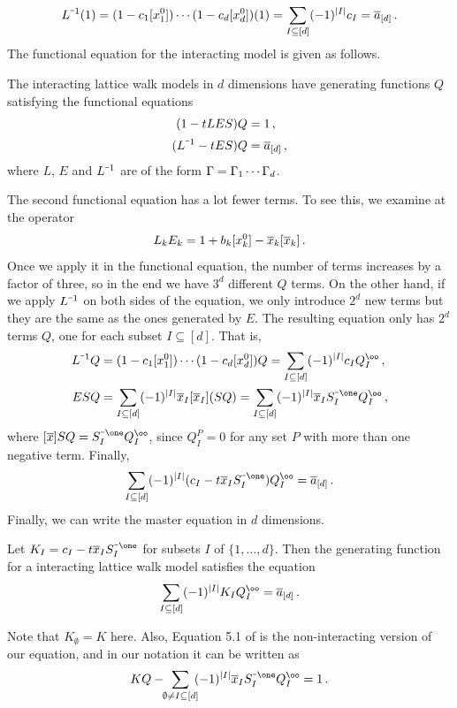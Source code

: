 \begin{align}
	L^{\um 1}(1) = (1-c_1[x_1^0])\cdots(1-c_d[x_d^0])(1) = \sum_{I\subseteq [d]}(-1)^{|I|}c_I = \ol a_{[d]}\,.
\end{align}
The \highD functional equation for the \classic interacting model is given as follows.
\begin{thm} The \classic interacting lattice walk models in $d$ dimensions have generating functions $Q$ satisfying the functional equations
\begin{align}
	(1-tLES)Q &= 1\,,\\
	(L^{\um 1}-t ES)Q &= \ol a_{[d]}\,,
\end{align}
where $L$, $E$ and $L^{\um 1}$ are of the form $\Gamma = \Gamma_1\cdots\Gamma_d$.
\end{thm}
The second functional equation has a lot fewer terms. To see this, we examine at the operator
\begin{align}
	L_kE_k = 1 + b_k[x_k^0]-\overline{x}_k[\overline{x}_k]\,.
\end{align}
Once we apply it in the functional equation, the number of terms increases by a factor of three, so in the end we have $3^d$ different $Q$ terms. On the other hand, if we apply $L^{\um 1}$ on both sides of the equation, we only introduce $2^d$ new terms but they are the same as the ones generated by $E$. The resulting equation only has $2^d$ terms $Q$, one for each subset $I \subseteq [d]$. That is,
\begin{subequations}
	\label{eq:ExpExt}
	\begin{align}
		L^{\um 1} Q &= (1-c_1[x_1^0])\cdots(1-c_d[x_d^0])Q = \sum_{I\subseteq [d]} (-1)^{|I|} c_I Q_I^\oo\,,\\
		 ESQ &= \sum_{I\subseteq [d]} (-1)^{|I|} \ol x_I [\ol x_I](SQ)= \sum_{I\subseteq [d]} (-1)^{|I|} \ol x_I S_I^{\um \one}Q_I^\oo\,,
	\end{align}
\end{subequations}
where $[\ol x]SQ = S_I^{\um \one} Q_I^\oo$, since $Q_I^P = 0$ for any set $P$ with more than one negative term. Finally,
\begin{align}
	\sum_{I \subseteq [d]}(-1)^{|I|}(c_I-t \ol x_IS_{I}^{\um \one})Q_I^\oo = \ol a_{[d]}\,.
\end{align}
Finally, we can write the master equation in $d$ dimensions.
\begin{thm} Let $K_I = c_I-t \ol x_I S_{I}^{\um \one}$ for subsets $I$ of $\{1,\ldots, d\}$. Then the generating function for a  \classic interacting \dD lattice walk model satisfies the equation
\begin{align}
	\label{eqn:Master}
	\sum_{I\subseteq [d]}(-1)^{|I|} K_I Q_I^\oo= \ol a_{[d]}\,.
\end{align}
\end{thm}
Note that $K_\emptyset = K$ here. Also, Equation 5.1 of \cite[p.~58]{melczer2014variants} is the non-interacting version of our equation, and in our notation it can be written as
\begin{align}
	KQ - \exx\sum_{\substack{\emptyset \neq I \subseteq [d]}}\exx(-1)^{|I|}\ol x_IS_I^{\um \one}Q_I^{\oo} = 1\,.
\end{align}

